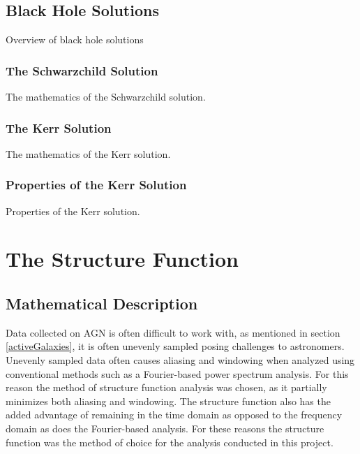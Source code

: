 \documentclass[12pt, oneside]{smuthesis}
\begin{document}
\section{\sc Black Hole Solutions} \label{blackHoleSolutions}

Overview of black hole solutions

\subsection{\sc The Schwarzchild Solution} \label{schwarzchildSolution}

The mathematics of the Schwarzchild solution.

\subsection{\sc The Kerr Solution} \label{kerrSolution}

The mathematics of the Kerr solution.

\subsection{\sc Properties of the Kerr Solution} \label{kerrSolutionProperties}

Properties of the Kerr solution.



\chapter{\sc The Structure Function} \label{structureFunction}

\section{\sc Mathematical Description} \label{mathematicalDesc}

Data collected on AGN is often difficult to work with, as mentioned in section \ref{activeGalaxies}, it is often unevenly sampled posing challenges to astronomers. Unevenly sampled data often causes aliasing and windowing when analyzed using conventional methods such as a Fourier-based power spectrum analysis. For this reason the method of structure function analysis was chosen, as it partially minimizes both aliasing and windowing. The structure function also has the added advantage of remaining in the time domain as opposed to the frequency domain as does the Fourier-based analysis. For these reasons the structure function was the method of choice for the analysis conducted in this project.
\end{document}
